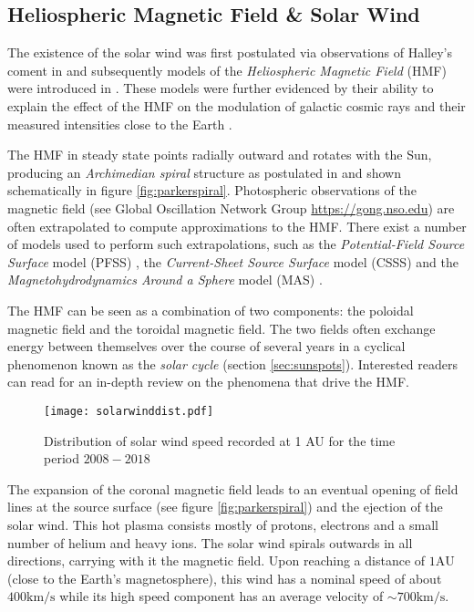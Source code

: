 \subsection{Heliospheric Magnetic Field \& Solar Wind}

The existence of the solar wind was first postulated via observations of Halley's coment in 
\citet{Bierman1,Bierman2,Bierman3} and subsequently models of the \emph{Heliospheric Magnetic Field} (HMF) 
were introduced in \citet{parker1958dynamics}. These models were further evidenced by their ability 
to explain the effect of the HMF on the modulation of galactic cosmic rays and their measured intensities 
close to the Earth \citep{ParkerSolarWind}. 

The HMF in steady state points radially outward and rotates with the Sun, producing an \emph{Archimedian spiral} 
structure as postulated in \cite{parker1958dynamics} and shown schematically in figure \ref{fig:parkerspiral}. 
Photospheric observations of the magnetic field (see Global Oscillation Network Group \url{https://gong.nso.edu}) 
are often extrapolated to compute approximations to the HMF. There exist a number of models used to perform such 
extrapolations, such as the \emph{Potential-Field Source Surface} model (PFSS) 
\citep{schatten1969model,altschuler1969magnetic}, the \emph{Current-Sheet Source Surface} model (CSSS) 
\citep{csss} and the \emph{Magnetohydrodynamics Around a Sphere} model (MAS) 
\citep{linker1999magnetohydrodynamic}. 

The HMF can be seen as a combination of two components: the poloidal magnetic field and the toroidal magnetic field.
The two fields often exchange energy between themselves over the course of several years in a cyclical phenomenon
known as the \emph{solar cycle} (section \ref{sec:sunspots}). Interested readers can read \citep{Owens2013} for an 
in-depth review on the phenomena that drive the HMF.

\begin{wrapfigure}{r}{0.4\textwidth}
    \centering\texttt{[image: solarwinddist.pdf]}
    \caption{
        \small Distribution of solar wind speed recorded at 1 AU for the time period $2008 - 2018$}
    \label{fig:solarwinddist}
\end{wrapfigure}

The expansion of the coronal magnetic field leads to an eventual opening of field lines at the source surface 
(see figure \ref{fig:parkerspiral}) and the ejection of the solar wind. This hot plasma consists mostly of protons, 
electrons and a small number of helium and heavy ions. The solar wind spirals outwards in all directions, carrying 
with it the magnetic field. Upon reaching a distance of $1 \text{AU}$ (close to the Earth's magnetosphere), this wind 
has a nominal speed of about $400 \text{km}/\text{s}$ while its high speed component has an average velocity of 
$\sim 700 \text{km}/\text{s}$.



